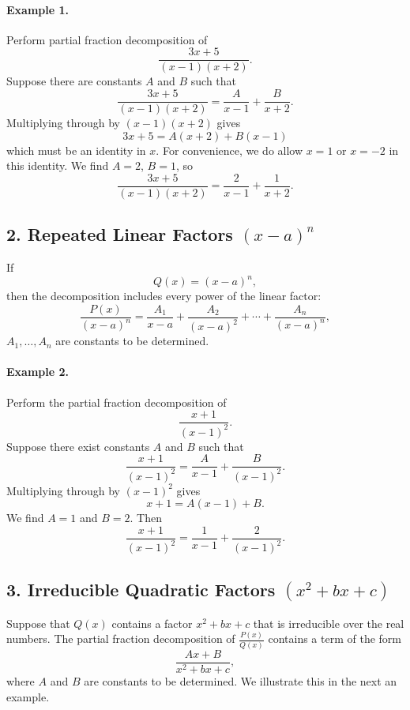 \paragraph{Example 1.} Perform  partial fraction decomposition of 
\[
\frac{3x+5}{(x-1)(x+2)}.
\]
Suppose there are constants $A$ and $B$ such that 
\[
\frac{3x+5}{(x-1)(x+2)}
= \frac{A}{x-1}+\frac{B}{x+2}.
\]
Multiplying through by $(x-1)(x+2)$ gives
\[
3x+5 = A(x+2)+B(x-1)
\] which must be an identity in $x.$ For convenience, we do allow $x=1$ or $x=-2$ in this identity.
We find $A=2$, $B=1$, so
\[
\frac{3x+5}{(x-1)(x+2)}
= \frac{2}{x-1}+\frac{1}{x+2}.
\]

\bigskip

\subsection*{2. Repeated Linear Factors \texorpdfstring{$(x-a)^n$}{(x-a)^n}}

If 
\[
Q(x)=(x-a)^n,
\]
then the decomposition includes every power of the linear factor:
\[
\frac{P(x)}{(x-a)^n}
= \frac{A_1}{x-a} + \frac{A_2}{(x-a)^2}
+ \cdots + \frac{A_n}{(x-a)^n},
\]
$A_1, \dots, A_n$ are constants to be determined.

\paragraph{Example 2.}  Perform the partial fraction decomposition of 
\[
\frac{x+1}{(x-1)^2}.
\]
Suppose there exist constants $A$ and $B$ such that
\[\frac{x+1}{(x-1)^2}= \frac{A}{x-1}+\frac{B}{(x-1)^2}.\]
Multiplying through by  $(x-1)^2$ gives
\[
x+1 = A(x-1) + B.
\]
We find $A=1$ and $B=2.$ Then
\[
\frac{x+1}{(x-1)^2}
= \frac{1}{x-1}+\frac{2}{(x-1)^2}.
\]

\bigskip

\subsection*{3. Irreducible Quadratic Factors \texorpdfstring{$(x^2+bx+c)$}{(x²+bx+c)}}

Suppose that $Q(x)$ contains  a factor $x^2+bx+c$ that is irreducible  over the real numbers.  The partial fraction decomposition of \(\displaystyle\frac{P(x)}{Q(x)}\) contains a term of the form
\[
\frac{Ax+B}{x^2+bx+c},
\]  where $A$ and $B$ are constants to be determined.
We illustrate this in the next an example.

